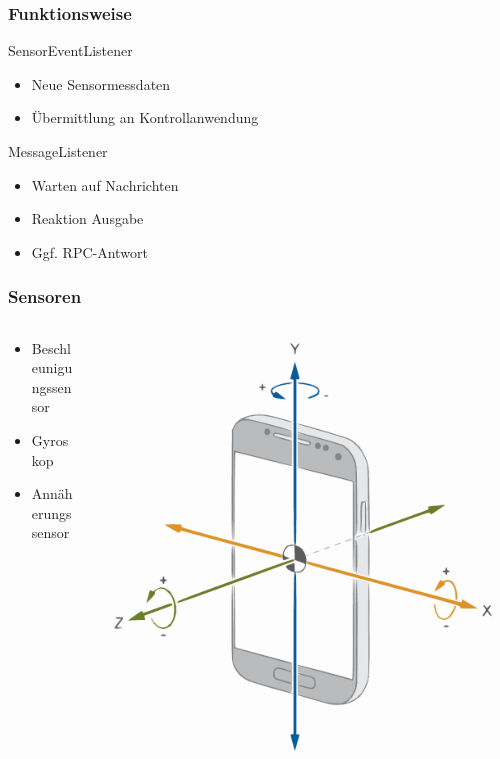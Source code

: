 \documentclass{beamer}
\begin{document}
\begin{frame}
    \frametitle[]{Funktionsweise}
    SensorEventListener
    \begin{itemize}
        \item Neue Sensormessdaten
        \item Übermittlung an Kontrollanwendung
    \end{itemize}
    \vspace{1cm}
    MessageListener
    \begin{itemize}
        \item Warten auf Nachrichten
        \item Reaktion Ausgabe
        \item Ggf. RPC-Antwort
    \end{itemize}

\end{frame}

\begin{frame}
    \frametitle[]{Sensoren}
    \begin{columns}
        \begin{column}{0.5\textwidth}
            \begin{itemize}
                \item Beschleunigungssensor
                \item Gyroskop
                \item Annäherungssensor
            \end{itemize}
        \end{column}
        \begin{column}[]{0.5\textwidth}
            \includegraphics[width=\textwidth]{images/android_axes.pdf}
        \end{column}
    \end{columns}
\end{frame}
\end{document}
